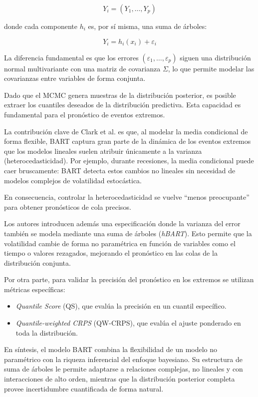 ﻿\documentclass[11pt,a4paper]{article}
\begin{document}
\[
Y_i=(Y_1,\dots,Y_p)
\]

donde cada componente $h_i$ es, por sí misma, una suma de árboles:

\[
Y_i=h_i(x_i)+\varepsilon_i
\]

La diferencia fundamental es que los errores $(\varepsilon_1,\dots,\varepsilon_p)$ siguen una distribución normal multivariante con una matriz de covarianza $\Sigma$, lo que permite modelar las covarianzas entre variables de forma conjunta.

Dado que el MCMC genera muestras de la distribución posterior, es posible extraer los cuantiles deseados de la distribución predictiva. Esta capacidad es fundamental para el pronóstico de eventos extremos.

La contribución clave de Clark et al. es que, al modelar la media condicional de forma flexible, BART captura gran parte de la dinámica de los eventos extremos que los modelos lineales suelen atribuir únicamente a la varianza (heterocedasticidad). Por ejemplo, durante recesiones, la media condicional puede caer bruscamente: BART detecta estos cambios no lineales sin necesidad de modelos complejos de volatilidad estocástica.

En consecuencia, controlar la heterocedasticidad se vuelve “menos preocupante” para obtener pronósticos de cola precisos.

Los autores introducen además una especificación donde la varianza del error también se modela mediante una suma de árboles (\textit{hBART}). Esto permite que la volatilidad cambie de forma no paramétrica en función de variables como el tiempo o valores rezagados, mejorando el pronóstico en las colas de la distribución conjunta.

Por otra parte, para validar la precisión del pronóstico en los extremos se utilizan métricas específicas:

\begin{itemize}
    \item \textit{Quantile Score} (QS), que evalúa la precisión en un cuantil específico.
    
    \item \textit{Quantile-weighted CRPS} (QW-CRPS), que evalúa el ajuste ponderado en toda la distribución.
\end{itemize}

En síntesis, el modelo BART combina la flexibilidad de un modelo no paramétrico con la riqueza inferencial del enfoque bayesiano. Su estructura de suma de árboles le permite adaptarse a relaciones complejas, no lineales y con interacciones de alto orden, mientras que la distribución posterior completa provee incertidumbre cuantificada de forma natural.
\end{document}
